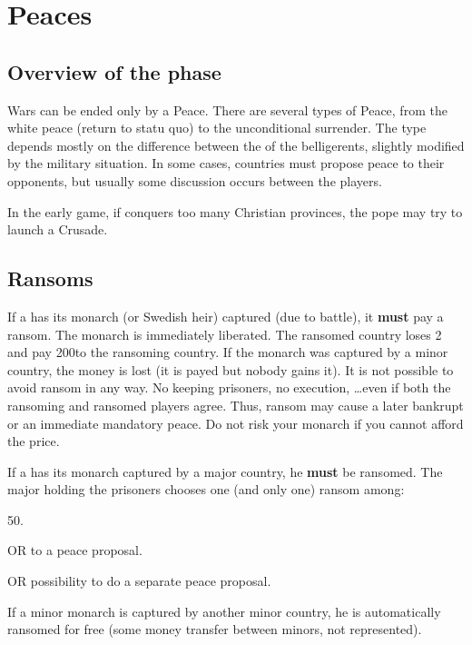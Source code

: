 
\chapter{Peaces}\label{chapter:Peace}

\section{Overview of the phase}

\aparag[Peace] Wars can be ended only by a Peace. There are several types of
Peace, from the white peace (return to statu quo) to the unconditional
surrender. The type depends mostly on the difference between the \STAB of the
belligerents, slightly modified by the military situation. In some cases,
countries must propose peace to their opponents, but usually some discussion
occurs between the players.

\aparag[Crusade] In the early game, if \TUR conquers too many Christian
provinces, the pope may try to launch a Crusade.

\aparag[Sequence.]
\PeaceDetails

\section{Ransoms}\label{chPeace:Ransoms}
\aparag[Majors] If a \MAJ has its monarch (or Swedish heir) captured (due to
battle), it \textbf{must} pay a ransom. The monarch is immediately liberated.
\bparag The ransomed country loses 2 \STAB and pay 200\ducats to the ransoming
country.
\bparag If the monarch was captured by a minor country, the money is lost
(it is payed but nobody gains it).
\bparag It is not possible to avoid ransom in any way. No keeping prisoners,
no execution, \ldots even if both the ransoming and ransomed players agree.
\bparag Thus, ransom may cause a later bankrupt or an immediate mandatory
peace. Do not risk your monarch if you cannot afford the price.

\aparag[Minors] If a \MIN has its monarch captured by a major country, he
\textbf{must} be ransomed.
\bparag The major holding the prisoners chooses one (and only one) ransom
among:
\begin{modlist}
\item 50\ducats.
\item[OR]  to a peace proposal.
\item[OR] possibility to do a separate peace proposal.
\end{modlist}
\bparag If a minor monarch is captured by another minor country, he is
automatically ransomed for free (some money transfer between minors, not
represented).

